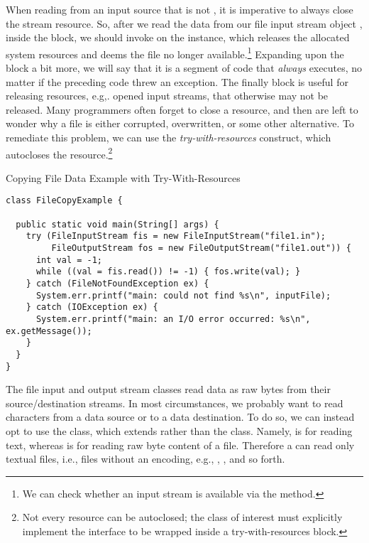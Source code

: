When reading from an input source that is not , it is imperative to always close the stream resource. So, after we read the data from our file input stream object , inside the  block, we should invoke  on the instance, which releases the allocated system resources and deems the file no longer available.\footnote{We can check whether an input stream is available via the  method.} Expanding upon the  block a bit more, we will say that it is a segment of code that \textit{always} executes, no matter if the preceding code threw an exception. The finally block is useful for releasing resources, e.g,. opened input streams, that otherwise may not be released. Many programmers often forget to close a resource, and then are left to wonder why a file is either corrupted, overwritten, or some other alternative. To remediate this problem, we can use the \textit{try-with-resources} construct, which autocloses the resource.\footnote{Not every resource can be autoclosed; the class of interest must explicitly implement the  interface to be wrapped inside a try-with-resources block.}


\begin{cl}{Copying File Data Example with Try-With-Resources}
\begin{lstlisting}[language=MyJava]
class FileCopyExample {

  public static void main(String[] args) {
    try (FileInputStream fis = new FileInputStream("file1.in");
         FileOutputStream fos = new FileOutputStream("file1.out")) {
      int val = -1;
      while ((val = fis.read()) != -1) { fos.write(val); }
    } catch (FileNotFoundException ex) {
      System.err.printf("main: could not find %s\n", inputFile);
    } catch (IOException ex) {
      System.err.printf("main: an I/O error occurred: %s\n", ex.getMessage());
    }
  }
}
\end{lstlisting}
\end{cl}

The file input and output stream classes read data as raw bytes from their source/destination streams. In most circumstances, we probably want to read characters from a data source or to a data destination. To do so, we can instead opt to use the  class, which extends  rather than the  class. Namely,  is for reading text, whereas  is for reading raw byte content of a file. Therefore a  can read only textual files, i.e., files without an encoding, e.g., , , and so forth.

